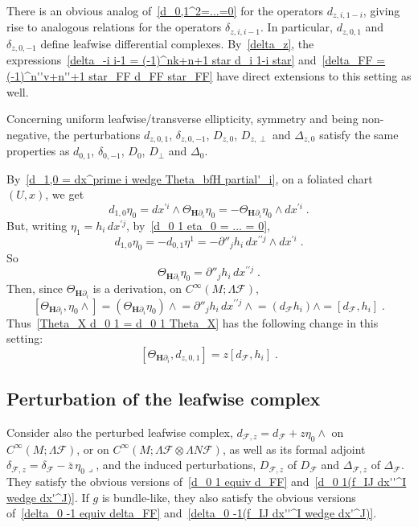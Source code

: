 \documentclass{memo-l}
\theoremstyle{plain}
\theoremstyle{definition}
\theoremstyle{remark}
\newcommand{\FF}{\mathcal{F}}
\newcommand{\bfH}{\boldsymbol{H}}
\numberwithin{section}{chapter}
\numberwithin{equation}{section}%
\begin{document}
There is an obvious analog of~\eqref{d_0,1^2=...=0} for the operators $d_{z,i,1-i}$, giving rise to analogous relations for the operators $\delta_{z,i,i-1}$. In particular, $d_{z,0,1}$ and $\delta_{z,0,-1}$ define leafwise differential complexes. By~\eqref{delta_z}, the expressions~\eqref{delta_-i i-1 = (-1)^nk+n+1 star d_i 1-i star} and~\eqref{delta_FF = (-1)^n''v+n''+1 star_FF d_FF star_FF} have direct extensions to this setting as well. 

Concerning uniform leafwise/transverse ellipticity, symmetry and being non-negative, the perturbations $d_{z,0,1}$, $\delta_{z,0,-1}$, $D_{z,0}$, $D_{z,\perp}$ and $\Delta_{z,0}$ satisfy the same properties as $d_{0,1}$, $\delta_{0,-1}$, $D_0$, $D_{\perp}$ and $\Delta_0$. 

By~\eqref{d_1,0 = dx^prime i wedge Theta_bfH partial'_i}, on a foliated chart $(U,x)$, we get
\[
d_{1,0}\eta_0=dx^{\prime i}\wedge\Theta_{\bfH\partial_i}\eta_0=-\Theta_{\bfH\partial_i}\eta_0\wedge dx^{\prime i}\;.
\]
But, writing $\eta_1=h_i\,dx^{\prime j}$, by~\eqref{d_0 1 eta_0 = ... = 0},
\[
d_{1,0}\eta_0=-d_{0,1}\eta^1=-\partial''_jh_i\,dx^{\prime\prime j}\wedge dx^{\prime i}\;.
\]
So 
\[
\Theta_{\bfH\partial_i}\eta_0=\partial''_jh_i\,dx^{\prime\prime j}\;.
\]
Then, since $\Theta_{\bfH\partial_i}$ is a derivation, on $C^\infty(M;\Lambda\FF)$,
\begin{equation}\label{[Theta_bfH eta_0 wedge]}
[\Theta_{\bfH\partial_i},{\eta_0\wedge}]={(\Theta_{\bfH\partial_i}\eta_0)\wedge}
=\partial''_jh_i\,{dx^{\prime\prime j}\wedge}=(d_\FF h_i)\wedge=[d_\FF,h_i]\;.
\end{equation}
Thus~\eqref{Theta_X d_0 1 = d_0 1 Theta_X} has the following change in this setting:
\[
[\Theta_{\bfH\partial_i},d_{z,0,1}]=z[d_\FF,h_i]\;.
\]


\subsection{Perturbation of the leafwise complex}\label{ss: perturbation of the leafwise complex}

Consider also the perturbed leafwise complex, $d_{\FF,z}=d_\FF+z\eta_0\wedge$\index{$d_{\FF,z}$} on $C^\infty(M;\Lambda\FF)$, or on $C^\infty(M;\Lambda\FF\otimes\Lambda N\FF)$, as well as its formal adjoint $\delta_{\FF,z}=\delta_\FF-\bar z\,{\eta_0\lrcorner}$,\index{$\delta_{\FF,z}$} and the induced perturbations, $D_{\FF,z}$\index{$D_{\FF,z}$} of $D_\FF$ and $\Delta_{\FF,z}$\index{$\Delta_{\FF,z}$} of $\Delta_\FF$. They satisfy the obvious versions of~\eqref{d_0 1 equiv d_FF} and~\eqref{d_0 1(f_IJ dx''^I wedge dx'^J)}. If $g$ is bundle-like, they also satisfy the obvious versions of~\eqref{delta_0 -1 equiv delta_FF} and~\eqref{delta_0 -1(f_IJ dx''^I wedge dx'^J)}. 
\end{document}
